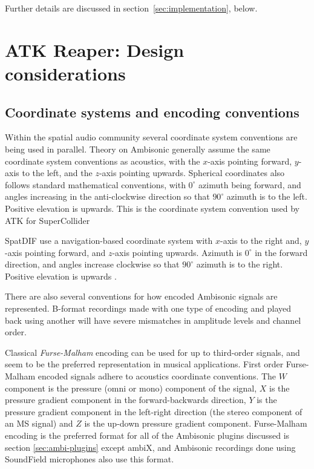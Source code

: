 \documentclass{article}
\begin{document}
Further details are discussed in section~\ref{sec:implementation}, below.


\section{ATK Reaper: Design considerations}\label{sec:design}

\subsection{Coordinate systems and encoding conventions}\label{sec:coordinate-systems}

Within the spatial audio community several coordinate system conventions are being used in parallel.
Theory on Ambisonic generally assume the same coordinate system conventions as acoustics, with the $x$-axis pointing forward, $y$-axis to the left, and the $z$-axis pointing upwards. 
Spherical coordinates also follows standard mathematical conventions, with $0^{\circ}$ azimuth being forward, and angles increasing in the anti-clockwise direction so that $90^{\circ}$ azimuth is to the left.
Positive elevation is upwards.
This is the coordinate system convention used by ATK for SuperCollider

SpatDIF use a navigation-based coordinate system with $x$-axis to the right and, $y$-axis pointing forward, and $z$-axis pointing upwards.
Azimuth is $0^{\circ}$ in the forward direction, and angles increase clockwise so that $90^{\circ}$ azimuth is to the right.
Positive elevation is upwards \cite{Peters:2013spatdif}.

There are also several conventions for how encoded Ambisonic signals are represented.
B-format recordings made with one type of encoding and played back using another will have severe mismatches in amplitude levels and channel order.

Classical \emph{Furse-Malham} encoding can be used for up to third-order signals, and seem to be the preferred representation in musical applications.
First order Furse-Malham encoded signals adhere to acoustics coordinate conventions.
The $W$ component is the pressure (omni or mono) component of the signal, $X$ is the pressure gradient component in the forward-backwards direction, $Y$ is the pressure gradient component in the left-right direction (the stereo component of an MS signal) and $Z$ is the up-down pressure gradient component.
Furse-Malham encoding is the preferred format for all of the Ambisonic plugins discussed is section \ref{sec:ambi-plugins} except ambiX, and Ambisonic recordings done using SoundField microphones also use this format.
\end{document}
